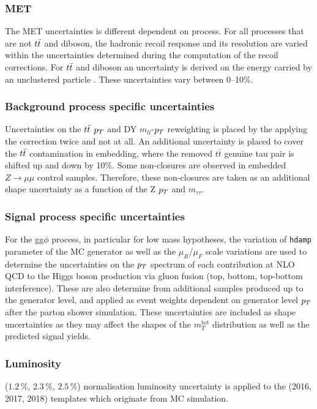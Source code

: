 \subsubsection{MET}
The MET uncertainties is different dependent on process.
For all processes that are not $t\bar{t}$ and diboson, the hadronic recoil response and its resolution are varied within the uncertainties determined during the computation of the recoil corrections.
For $t\bar{t}$ and diboson an uncertainty is derived on the energy carried by an unclustered particle \cite{}.
These uncertainties vary between 0--10\%.

\subsubsection{Background process specific uncertainties}
Uncertainties on the $t\bar{t}$ $p_{T}$ and DY $m_{ll}$-$p_{T}$ reweighting is placed by the applying the correction twice and not at all.
An additional uncertainty is placed to cover the $t\bar{t}$ contamination in embedding, where the removed $t\bar{t}$ genuine tau pair is shifted up and down by 10\%.
Some non-closures are observed in embedded $Z\to\mu\mu$ control samples. 
Therefore, these non-closures are taken as an additional shape uncertainty as a function of the Z $p_{T}$ and $m_{\tau\tau}$.

\subsubsection{Signal process specific uncertainties}
For the gg$\phi$ process, in particular for low mass hypotheses, the variation of \texttt{hdamp} parameter of the \POWHEG MC generator as well as the $\mu_{R}$/$\mu_{F}$ scale variations are used to determine the uncertainties
on the $p_{T}$ spectrum of each contribution at NLO QCD to the Higgs boson production via gluon fusion (top, bottom, top-bottom interference). These are also determine from additional samples produced
up to the generator level, and applied as event weights dependent on generator level $p_{T}$ after the parton shower simulation. These uncertainties are included as shape uncertainties as they may affect the shapes of the $m_{T}^{\text{tot}}$ distribution as well as the predicted signal yields.

\subsubsection{Luminosity}
($1.2\,\%$, $2.3\,\%$, $2.5\,\%$) normalisation luminosity uncertainty is applied to the (2016, 2017, 2018) templates which originate from MC simulation.

